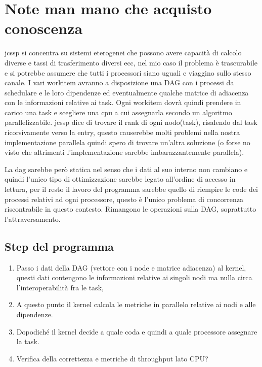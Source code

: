 \documentclass{article}
\begin{document}
    \section{Note man mano che acquisto conoscenza}
        jcssp si concentra su sistemi eterogenei che possono avere capacità di calcolo diverse e tassi di trasferimento diversi ecc, nel mio caso il problema è trascurabile e si potrebbe assumere che tutti i processori siano uguali e viaggino sullo stesso canale.
        I vari workitem avranno a disposizione una DAG con i processi da schedulare e le loro dipendenze ed eventualmente qualche matrice di adiacenza con le informazioni relative ai task. Ogni workitem dovrà quindi prendere in carico una task e scegliere una cpu a cui assegnarla secondo un algoritmo parallelizzabile. 
        jcssp dice di trovare il rank di ogni nodo(task), risalendo dal task ricorsivamente verso la entry, questo causerebbe molti problemi nella nostra implementazione parallela quindi spero di trovare un'altra soluzione (o forse no visto che altrimenti l'implementazione sarebbe imbarazzantemente parallela).


        La dag sarebbe però statica nel senso che i dati al suo interno non cambiano e quindi l'unico tipo di ottimizzazione sarebbe legato all'ordine di accesso in lettura, per il resto il lavoro del programma sarebbe quello di riempire le code dei processi relativi ad ogni processore, questo è l'unico problema di concorrenza riscontrabile in questo contesto.
        Rimangono le operazioni sulla DAG, soprattutto l'attraversamento.

        \subsection{Step del programma}
            \begin{enumerate}
                \item Passo i dati della DAG (vettore con i node e matrice adiacenza) al kernel, questi dati contengono le informazioni relative ai singoli nodi ma nulla circa l'interoperabilità fra le task, 
                \item A questo punto il kernel calcola le metriche in parallelo relative ai nodi e alle dipendenze.
                \item Dopodiché il kernel decide a quale coda e quindi a quale processore assegnare la task.
                \item Verifica della correttezza e metriche di throughput lato CPU?
            \end{enumerate}
\end{document}
